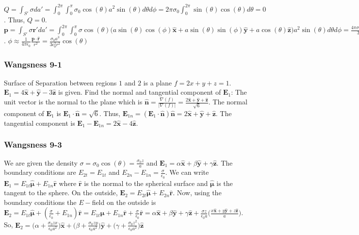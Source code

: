 \documentclass[oneside]{book}
\theoremstyle{definition}
\newcommand*\B[1]{\mathbf{#1}}
\newcommand*\Bh[1]{\mathbf{\hat{#1}}}
\begin{document}
$Q = \int_{S'} \sigma da' = \int_{0}^{2\pi} \int_{0}^{\pi} \sigma_{0} \cos(\theta) a^2 \sin(\theta) d\theta d\phi = 2\pi \sigma_{0} \int_{0}^{2\pi} \sin(\theta)\cos(\theta)d\theta = 0$. Thus, $Q=0$. $\B{p} = \int_{S'}\sigma \B{r}' da' = \int_{0}^{2\pi} \int_{0}^{\pi} \sigma \cos(\theta) \big( a\sin(\theta) \cos(\phi) \Bh{x} + a \sin(\theta)\sin(\phi) \Bh{y} + a\cos(\theta) \Bh{z}\big)a^2\sin(\theta)d\theta d\phi = \frac{4\pi \sigma_0 a^3}{3} \Bh{z}$. $\phi \approx \frac{1}{4\pi \epsilon_0} \frac{\B{p}\cdot \Bh{r}}{r^2} = \frac{\sigma_0 a^3}{3\epsilon_0^2 r^2}\cos(\theta)$

\subsubsection{Wangsness 9-1}

Surface of Separation between regions $1$ and $2$ is a plane $f=2x+y+z=1$. $\B{E}_1 = 4\Bh{x}+\Bh{y}-3\Bh{z}$ is given. Find the normal and tangential component of $\B{E}_1$: The unit vector is the normal to the plane which is $\Bh{n}=\frac{\nabla(f)}{|\nabla(f)|} = \frac{2\Bh{x}+\Bh{y}+\Bh{z}}{\sqrt{6}}$. The normal component of $\B{E}_1$ is $\B{E}_1 \cdot \Bh{n} = \sqrt{6}$. Thus, $\B{E}_{1n} = (\B{E}_1 \cdot \Bh{n})\Bh{n} = 2\Bh{x}+\Bh{y}+\Bh{z}$. The tangential component is $\B{E}_1 - \B{E}_{1n} = 2\Bh{x}-4\Bh{z}$.

\subsubsection{Wangsness 9-3}

We are given the density $\sigma = \sigma_0 \cos(\theta) = \frac{\sigma_0 z}{a}$ and $\B{E}_1 = \alpha \Bh{x}+\beta \Bh{y}+ \gamma \Bh{z}$. The boundary conditions are $E_{2t} = E_{1t}$ and $E_{2n}-E_{1n} = \frac{\sigma}{\epsilon_0}$. We can write $\B{E}_1 = E_{1t}\Bh{\mu}+E_{1n} \Bh{r}$ where $\Bh{r}$ is the normal to the spherical surface and $\Bh{\mu}$ is the tangent to the sphere. On the outside, $\B{E}_2 = E_{2t}\Bh{\mu}+E_{2n}\Bh{r}$. Now, using the boundary conditions the $E-$field on the outside is $\B{E}_2 = E_{1t}\Bh{\mu}+(\frac{\sigma}{\epsilon_0}+E_{1n})\Bh{r} = E_{1t}\Bh{\mu}+E_{1n}\Bh{r}+\frac{\sigma}{\epsilon_0}\Bh{r} = \alpha \Bh{x}+\beta \Bh{y}+\gamma \Bh{z} + \frac{\sigma z}{\epsilon_0 a}\bigg(\frac{x\Bh{x}+y\Bh{y}+z\Bh{z}}{a}\bigg)$. So, $\B{E}_2 = \big(\alpha+\frac{\sigma_0 zx}{\epsilon_0 a^2}\big)\Bh{x}+\big(\beta + \frac{\sigma_0 zy}{\epsilon_0 a^2}\big)\Bh{y}+\big(\gamma+ \frac{\sigma_0 z^2}{\epsilon_0 a^2}\big)\Bh{z}$
\end{document}
